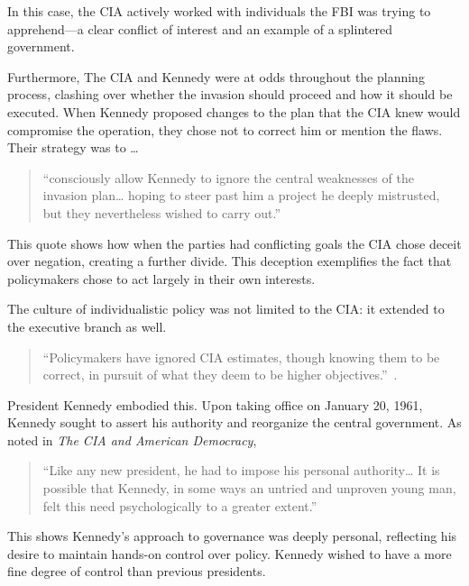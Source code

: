 \documentclass[12pt, twoside]{article}
\begin{document}
    In this case, the CIA actively worked with individuals the FBI was trying to apprehend—a clear conflict of interest and an example of a splintered government.

    Furthermore, The CIA and Kennedy were at odds throughout the planning process, clashing over whether the invasion should proceed and how it should be executed. When Kennedy proposed changes to the plan that the CIA knew would compromise the operation, they chose not to correct him or mention the flaws. Their strategy was to \ldots
    
    \begin{quotation}
        ``consciously allow Kennedy to ignore the central weaknesses of the invasion plan… hoping to steer past him a project he deeply mistrusted, but they nevertheless wished to carry out.'' \parencite{Vandenbroucke1984} 
    \end{quotation}
    
    This quote shows how when the parties had conflicting goals the CIA chose deceit over negation, creating a further divide. This deception exemplifies the fact that policymakers chose to act largely in their own interests.

    The culture of individualistic policy was not limited to the CIA: it extended to the executive branch as well. 

    \begin{quote}
        ``Policymakers have ignored CIA estimates, though knowing them to be correct, in pursuit of what they deem to be higher objectives.''~\parencite{JeffreysJones2003}.
    \end{quote}
    
    President Kennedy embodied this. Upon taking office on January 20, 1961, Kennedy sought to assert his authority and reorganize the central government. As noted in \textit{The CIA and American Democracy}, 

    \begin{quotation}
        ``Like any new president, he had to impose his personal authority… It is possible that Kennedy, in some ways an untried and unproven young man, felt this need psychologically to a greater extent.''~\parencite{JeffreysJones2003}
    \end{quotation}  

    This shows Kennedy's approach to governance was deeply personal, reflecting his desire to maintain hands-on control over policy. Kennedy wished to have a more fine degree of control than previous presidents.
\end{document}

